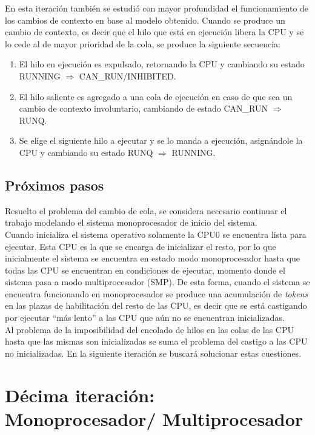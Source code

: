 \documentclass[a4paper]{book}
\begin{document}
En esta iteraci\'on tambi\'en se estudi\'o con mayor profundidad el funcionamiento de los cambios de contexto en base al modelo obtenido. Cuando se produce un cambio de contexto, es decir que el hilo que est\'a en ejecuci\'on libera la CPU y se lo cede al de mayor prioridad de la cola, se produce la siguiente secuencia:
\begin{enumerate}
\item El hilo en ejecuci\'on es expulsado, retornando la CPU y cambiando su estado RUNNING $\Rightarrow$ CAN\_RUN/INHIBITED.
\item El hilo saliente es agregado a una cola de ejecuci\'on en caso de que sea un cambio de contexto involuntario, cambiando de estado CAN\_RUN $\Rightarrow$ RUNQ.
\item Se elige el siguiente hilo a ejecutar y se lo manda a ejecuci\'on, asign\'andole la CPU y cambiando su estado RUNQ $\Rightarrow$ RUNNING.
\end{enumerate}

\subsection{Pr\'oximos pasos}
Resuelto el problema del cambio de cola, se considera necesario continuar el trabajo modelando el sistema monoprocesador de inicio del sistema.\\

Cuando inicializa el sistema operativo solamente la CPU0 se encuentra lista para ejecutar. Esta CPU es la que se encarga de inicializar el resto, por lo que inicialmente el sistema se encuentra en estado modo monoprocesador hasta que todas las CPU se encuentran en condiciones de ejecutar, momento donde el sistema pasa a modo multiprocesador (SMP). De esta forma, cuando el sistema se encuentra funcionando en monoprocesador se produce una acumulaci\'on de \emph{tokens} en las plazas de habilitación del resto de las CPU, es decir que se est\'a castigando por ejecutar “m\'as lento” a las CPU que a\'un no se encuentran inicializadas.\\

Al problema de la imposibilidad del encolado de hilos en las colas de las CPU hasta que las mismas son inicializadas se suma el problema del castigo a las CPU no inicializadas. En la siguiente iteraci\'on se buscar\'a solucionar estas cuestiones.


\newpage
\section{D\'ecima iteraci\'on: Monoprocesador/ Multiprocesador}
\end{document}
